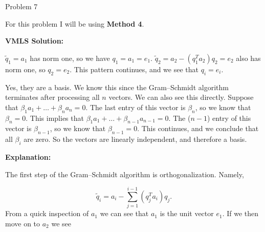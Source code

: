 \begin{problem}{Problem 7}
    \begin{Highlight}[Solution]
        For this problem I will be using \textbf{Method 4}. \vspace*{1em}

        \textbf{VMLS Solution:} \vspace*{1em}

        $\tilde{q}_{1} = a_{1}$ has norm one, so we have $q_{1} = a_{1} = e_{1}$. $\tilde{q}_{2} = a_{2} - (q_{1}^{T}a_{2})q_{2} = e_{2}$ also has norm one, so $q_{2} = e_{2}$. This pattern continues,
        and we see that $q_{i} = e_{i}$.

        Yes, they are a basis. We know this since the Gram–Schmidt algorithm terminates after processing all $n$ vectors. We can also see this directly. Suppose that $\beta_{1}a_{1} + \dots + 
        \beta_{n}a_{n} = 0$. The last entry of this vector is $\beta_{n}$, so we know that $\beta_{n} = 0$. This implies that $\beta_{1}a_{1} + \dots + \beta_{n - 1}a_{n - 1} = 0$. The ($n - 1$) entry
        of this vector is $\beta_{n - 1}$, so we know that $\beta_{n - 1} = 0$. This continues, and we conclude that all $\beta_{i}$ are zero. So the vectors are linearly independent, and therefore a basis. \vspace*{1em}

        \textbf{Explanation:} \vspace*{1em}

        The first step of the Gram–Schmidt algorithm is orthogonalization. Namely,

        \setcounter{equation}{0}
        \begin{equation}
            \tilde{q}_{i} = a_{i} - \sum_{j = 1}^{i - 1} (q_{j}^{T}a_{i})q_{j}.
        \end{equation}
        From a quick inspection of $a_{1}$ we can see that $a_{1}$ is the unit vector $e_{1}$. If we then move on to $a_{2}$ we see


\end{Highlight}
\end{problem}
